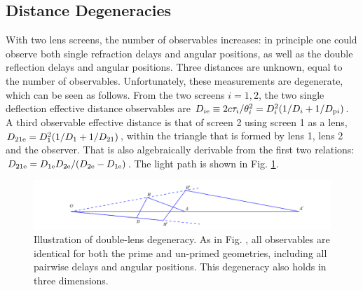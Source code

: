 \documentclass[useAMS,usenatbib]{mn2e}
\begin{document}
\subsection{Distance Degeneracies}
\label{sec:degeneracy}
With two lens screens, the number of observables increases: in
principle one could observe both single refraction delays and angular
positions, as well as the double reflection delays and angular
positions.  Three distances are unknown, equal to the number of
observables.  Unfortunately, these measurements are degenerate, which
can be seen as follows. From the two screens $i=1,2$, the two single
deflection effective distance observables are
$D_{i{\rm e}} \equiv 2c\tau_i/\theta_i^2=D_i^2(1/D_i+1/D_{{\rm p}i})$.  A third
observable effective distance is that of screen 2 using screen 1 as a
lens, $D_{21{\rm e}}=D_1^2(1/D_1+1/D_{21})$, within the triangle that is formed by lens 1, lens 2 and the observer. That is also algebraically
derivable from the first two relations:
$D_{{21}{\rm e}}=D_{1{\rm e}}D_{2{\rm e}}/(D_{2{\rm e}}-D_{1{\rm e}})$. The light path is shown in Fig. \ref{fig:double_degeneracy}.
\begin{figure}
\centering
\hspace*{-1in}\includegraphics[width=9in]{double_degeneracy.pdf}
\caption{Illustration of double-lens degeneracy.  As in
  Fig. \protect{\ref{fig:Singledegeneracy}}, all observables are identical
  for both the prime and un-primed geometries, including all pairwise
  delays and angular positions.  This degeneracy also holds in three dimensions.}
\label{fig:double_degeneracy}
\end{figure}
\end{document}
